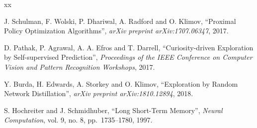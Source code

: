 \documentclass[a4paper,12pt,oneside]{book}
\renewcommand{\baselinestretch}{1.4}
\begin{document}
\appendix

\def\baselinestretch{1}
\vspace{-2cm}
\renewcommand{\bibname}{Tài liệu tham khảo}
\clearpage
{}
{}
\renewcommand{\refname}{Literary works}
\begin{thebibliography}{xx}
	
	
	J. Schulman, F. Wolski, P. Dhariwal, A. Radford and O. Klimov, ``Proximal Policy Optimization Algorithms'',
	{\em arXiv preprint arXiv:1707.06347}, 2017.

	D. Pathak, P. Agrawal, A. A. Efros and T. Darrell, ``Curiosity-driven Exploration by Self-supervised Prediction'',
	{\em Proceedings of the IEEE Conference on Computer Vision and Pattern Recognition Workshops}, 2017.

	Y. Burda, H. Edwards, A. Storkey and O. Klimov, ``Exploration by Random Network Distillation'',
	{\em arXiv preprint arXiv:1810.12894}, 2018.

	S. Hochreiter and J. Schmidhuber, ``Long Short-Term Memory'',
	{\em Neural Computation}, vol. 9, no. 8, pp.~1735--1780, 1997.


\end{thebibliography}
\end{document}
